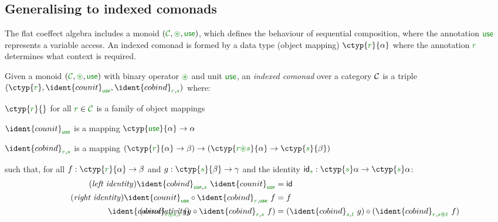 
\subsection{Generalising to indexed comonads}
The flat coeffect algebra includes a monoid $(\C, \cseq, \cunit)$, which defines the behaviour of
sequential composition, where the annotation $\cunit$ represents a variable access. An indexed 
comonad is formed by a data type (object mapping) $\ctyp{\cclrd{r}}{\alpha}$ where the annotation 
$\cclrd{r}$ determines what context is required. 

\begin{definition}
Given a monoid $(\C, \cseq, \cunit)$ with binary operator $\cseq$ and unit $\cunit$, an 
\emph{indexed comonad} over a category $\mathcal{C}$ is a triple 
$(\ctyp{\cclrd{r}{}}, \ident{counit}_{\cunit}, \ident{cobind}_{\cclrd{r}, \cclrd{s}})$ where:

\begin{compactitem}
\item $\ctyp{\cclrd{r}}{}$ for all $\cclrd{r} \in \C$ is a family of object mappings 
\item $\ident{counit}_{\cunit}$ is a mapping $\ctyp{\cunit}{\alpha} \rightarrow \alpha$ 
\item $\ident{cobind}_{\cclrd{r}, \cclrd{s}}$ is a mapping $(\ctyp{\cclrd{r}}{\alpha} \rightarrow \beta) 
  \rightarrow (\ctyp{\cclrd{r}\cseq\cclrd{s}}{\alpha} \rightarrow \ctyp{\cclrd{s}}{\beta})$
\end{compactitem}
such that, for all $f:\ctyp{\cclrd{r}}{\alpha} \rightarrow \beta$ and $g:\ctyp{\cclrd{s}}{\beta} \rightarrow \gamma$
and the identity $\idf{\cclrd{s}} : \ctyp{\cclrd{s}}\alpha \rightarrow \ctyp{\cclrd{s}}\alpha$:
\begin{align}
\tag{\emph{left identity}}
  \ident{cobind}_{\cunit, \cclrd{s}}~\ident{counit}_{\cunit} &= \idf{}
  \\
\tag{\emph{right identity}}
  \ident{counit}_{\cunit} \circ \ident{cobind}_{\cclrd{r}, \cunit}~f &= f
  \\
\tag{\emph{associativity}}
\hspace{-10em}
  \ident{cobind}_{\cclrd{r}\cseq\cclrd{s},\cclrd{t}}~(g \circ \ident{cobind}_{\cclrd{r}, \cclrd{s}}~f) &= 
    (\ident{cobind}_{\cclrd{s}, \cclrd{t}}~g) \circ (\ident{cobind}_{\cclrd{r}, \cclrd{s}\cseq\cclrd{t}}~f)
\end{align}
\end{definition}

